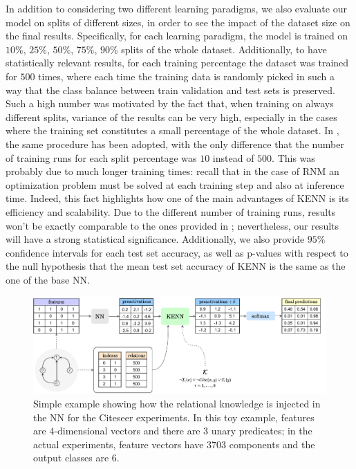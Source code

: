In addition to considering two different learning paradigms, we also evaluate our model on splits of different sizes, in order to see the impact of the dataset size on the final results. Specifically, for each learning paradigm, the model is trained on $10\%$, $25\%$, $50\%$, $75\%$, $90\%$ splits of the whole dataset. Additionally, to have statistically relevant results, for each training percentage the dataset was trained for $500$ times, where each time the training data is randomly picked in such a way that the class balance between train validation and test sets is preserved. Such a high number was motivated by the fact that, when training on always different splits, variance of the results can be very high, especially in the cases where the training set constitutes a small percentage of the whole dataset. In \cite{marra2020relational}, the same procedure has been adopted, with the only difference that the number of training runs for each split percentage was $10$ instead of $500$. \textcolor{unipd}{This was probably due to much longer training times: recall that in the case of RNM an optimization problem must be solved at each training step and also at inference time}. Indeed, this fact highlights how one of the main advantages of KENN is its efficiency and scalability. Due to the different number of training runs, results won't be exactly comparable to the ones provided in \cite{marra2020relational}; nevertheless, our results will have a strong statistical significance. Additionally, we also provide $95\%$ confidence intervals for each test set accuracy, as well as \mbox{p-values} with respect to the null hypothesis that the mean test set accuracy of KENN is the same as the one of the base NN.

\begin{figure}
	\centering
	\includegraphics[width=\linewidth]{figures/citeseer_setup.drawio.pdf}
	\caption{Simple example showing how the relational knowledge is injected in the NN for the Citeseer experiments. In this toy example, features are $4$-dimensional vectors and there are $3$ unary predicates; in the actual experiments, feature vectors have $3703$ components and the output classes are $6$.}
	\label{fig:citeseer_setup_chart}
\end{figure}


